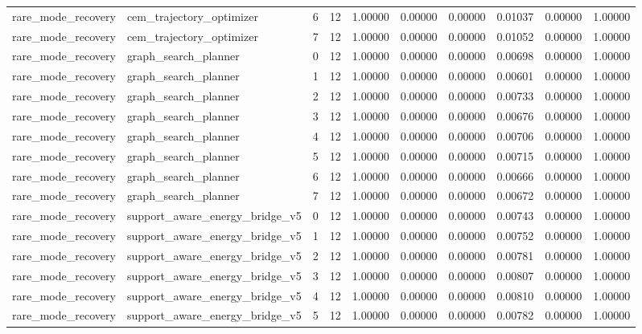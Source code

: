 \documentclass{article}
\begin{document}
\begin{table}[tbp]
{\begin{tabular}{llllllllll}
rare\_mode\_recovery & cem\_trajectory\_optimizer & 6 & 12 & 1.00000 & 0.00000 & 0.00000 & 0.01037 & 0.00000 & 1.00000 \\
rare\_mode\_recovery & cem\_trajectory\_optimizer & 7 & 12 & 1.00000 & 0.00000 & 0.00000 & 0.01052 & 0.00000 & 1.00000 \\
rare\_mode\_recovery & graph\_search\_planner & 0 & 12 & 1.00000 & 0.00000 & 0.00000 & 0.00698 & 0.00000 & 1.00000 \\
rare\_mode\_recovery & graph\_search\_planner & 1 & 12 & 1.00000 & 0.00000 & 0.00000 & 0.00601 & 0.00000 & 1.00000 \\
rare\_mode\_recovery & graph\_search\_planner & 2 & 12 & 1.00000 & 0.00000 & 0.00000 & 0.00733 & 0.00000 & 1.00000 \\
rare\_mode\_recovery & graph\_search\_planner & 3 & 12 & 1.00000 & 0.00000 & 0.00000 & 0.00676 & 0.00000 & 1.00000 \\
rare\_mode\_recovery & graph\_search\_planner & 4 & 12 & 1.00000 & 0.00000 & 0.00000 & 0.00706 & 0.00000 & 1.00000 \\
rare\_mode\_recovery & graph\_search\_planner & 5 & 12 & 1.00000 & 0.00000 & 0.00000 & 0.00715 & 0.00000 & 1.00000 \\
rare\_mode\_recovery & graph\_search\_planner & 6 & 12 & 1.00000 & 0.00000 & 0.00000 & 0.00666 & 0.00000 & 1.00000 \\
rare\_mode\_recovery & graph\_search\_planner & 7 & 12 & 1.00000 & 0.00000 & 0.00000 & 0.00672 & 0.00000 & 1.00000 \\
rare\_mode\_recovery & support\_aware\_energy\_bridge\_v5 & 0 & 12 & 1.00000 & 0.00000 & 0.00000 & 0.00743 & 0.00000 & 1.00000 \\
rare\_mode\_recovery & support\_aware\_energy\_bridge\_v5 & 1 & 12 & 1.00000 & 0.00000 & 0.00000 & 0.00752 & 0.00000 & 1.00000 \\
rare\_mode\_recovery & support\_aware\_energy\_bridge\_v5 & 2 & 12 & 1.00000 & 0.00000 & 0.00000 & 0.00781 & 0.00000 & 1.00000 \\
rare\_mode\_recovery & support\_aware\_energy\_bridge\_v5 & 3 & 12 & 1.00000 & 0.00000 & 0.00000 & 0.00807 & 0.00000 & 1.00000 \\
rare\_mode\_recovery & support\_aware\_energy\_bridge\_v5 & 4 & 12 & 1.00000 & 0.00000 & 0.00000 & 0.00810 & 0.00000 & 1.00000 \\
rare\_mode\_recovery & support\_aware\_energy\_bridge\_v5 & 5 & 12 & 1.00000 & 0.00000 & 0.00000 & 0.00782 & 0.00000 & 1.00000 \\

\end{tabular}}
\end{table}
\end{document}
